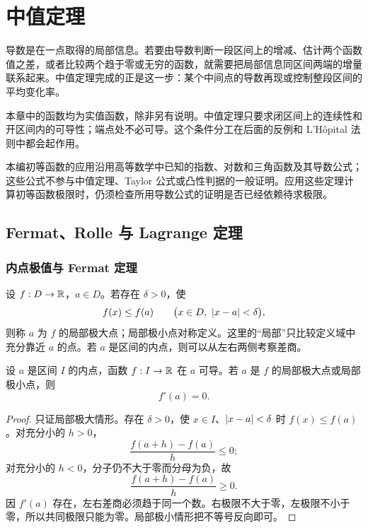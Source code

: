 \chapter{中值定理}
\label{chap:mean-value-theorems}

导数是在一点取得的局部信息。若要由导数判断一段区间上的增减、估计两个函数值之差，或者比较两个趋于零或无穷的函数，就需要把局部信息同区间两端的增量联系起来。中值定理完成的正是这一步：某个中间点的导数再现或控制整段区间的平均变化率。

本章中的函数均为实值函数，除非另有说明。中值定理只要求闭区间上的连续性和开区间内的可导性；端点处不必可导。这个条件分工在后面的反例和 L'Hôpital 法则中都会起作用。

本编初等函数的应用沿用高等数学中已知的指数、对数和三角函数及其导数公式；这些公式不参与中值定理、Taylor 公式或凸性判据的一般证明。应用这些定理计算初等函数极限时，仍须检查所用导数公式的证明是否已经依赖待求极限。

\section{Fermat、Rolle 与 Lagrange 定理}
\label{sec:fermat-rolle-lagrange}

\subsection{内点极值与 Fermat 定理}

设 \(f:D\to\mathbb{R}\)，\(a\in D\)。若存在 \(\delta>0\)，使
\[
 f(x)\le f(a)
 \qquad\bigl(x\in D,\ \left|x-a\right|<\delta\bigr),
\]
则称 \(a\) 为 \(f\) 的局部极大点；局部极小点对称定义。这里的“局部”只比较定义域中充分靠近 \(a\) 的点。若 \(a\) 是区间的内点，则可以从左右两侧考察差商。

\begin{theorem}[Fermat 定理]
\label{thm:fermat-stationary}
设 \(a\) 是区间 \(I\) 的内点，函数 \(f:I\to\mathbb{R}\) 在 \(a\) 可导。若 \(a\) 是 \(f\) 的局部极大点或局部极小点，则
\[
 f'(a)=0.
\]
\end{theorem}

\begin{proof}
只证局部极大情形。存在 \(\delta>0\)，使 \(x\in I\)、\(\left|x-a\right|<\delta\) 时 \(f(x)\le f(a)\)。对充分小的 \(h>0\)，
\[
 \frac{f(a+h)-f(a)}{h}\le0;
\]
对充分小的 \(h<0\)，分子仍不大于零而分母为负，故
\[
 \frac{f(a+h)-f(a)}{h}\ge0.
\]
因 \(f'(a)\) 存在，左右差商必须趋于同一个数。右极限不大于零，左极限不小于零，所以共同极限只能为零。局部极小情形把不等号反向即可。
\end{proof}

